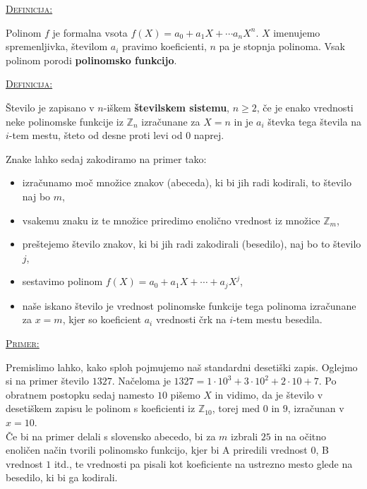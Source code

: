 \documentclass[a4paper, 12pt]{article} %
\newcommand{\Zn}{\mathbb{Z}_n}
\newenvironment{matematika}[1]{
\textcolor{bostonuniversityred}{\underline{\textsc{#1:}}}
}{
}
\begin{document}
\begin{matematika}{Definicija}
Polinom $f$ je formalna vsota $f(X) = a_0 + a_1 X + \cdots a_n X^n$. $X$ imenujemo spremenljivka, številom $a_i$ pravimo koeficienti, $n$ pa je stopnja polinoma. Vsak polinom porodi \textbf{polinomsko funkcijo}. \\
\end{matematika}

\begin{matematika}{Definicija}
Število je zapisano v $n$-iškem \textbf{številskem sistemu}, $n \geq 2$, če je enako vrednosti neke polinomske funkcije iz $\Zn$ izračunane za $X = n$ in je $a_i$ števka tega števila na $i$-tem mestu, šteto od desne proti levi od $0$ naprej. \\
\end{matematika}

Znake lahko sedaj zakodiramo na primer tako:
\begin{itemize}[label=]
\item izračunamo moč množice znakov (abeceda), ki bi jih radi kodirali, to število naj bo $m$,
\item vsakemu znaku iz te množice priredimo enolično vrednost iz množice $\mathbb{Z}_m$,
\item preštejemo število znakov, ki bi jih radi zakodirali (besedilo), naj bo to število $j$,
\item sestavimo polinom $f(X) = a_0 + a_1 X + \cdots + a_j X^j$,
\item naše iskano število je vrednost polinomske funkcije tega polinoma izračunane za $x=m$, kjer so koeficient $a_i$ vrednosti črk na $i$-tem mestu besedila.
\end{itemize}
\begin{matematika}{Primer}
Premislimo lahko, kako sploh pojmujemo naš standardni desetiški zapis. Oglejmo si na primer število $1327$. Načeloma je $1327 = 1 \cdot 10^3 + 3 \cdot 10^2 + 2 \cdot 10 + 7$. Po obratnem postopku sedaj namesto $10$ pišemo $X$ in vidimo, da je število v desetiškem zapisu le polinom s koeficienti iz $\mathbb{Z}_{10}$, torej med $0$ in $9$, izračunan v $x = 10$. \\
Če bi na primer delali s slovensko abecedo, bi za $m$ izbrali $25$ in na očitno enoličen način tvorili polinomsko funkcijo, kjer bi A priredili vrednost $0$, B vrednost $1$ itd., te vrednosti pa pisali kot koeficiente na ustrezno mesto glede na besedilo, ki bi ga kodirali. \\
\end{matematika}
\end{document}
